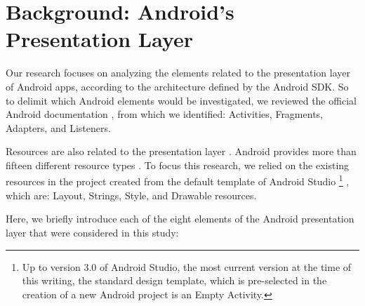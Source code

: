 




\section{Background: Android's Presentation Layer}

Our research focuses on analyzing the elements related to the presentation layer of Android apps, according to the architecture defined by the Android \acs{SDK}. So to delimit which Android elements would be investigated,
we reviewed the official Android documentation \cite{AndroidDeveloperSite2016}, from which we identified: Activities, Fragments, Adapters, and Listeners.

Resources are also related to the presentation layer \cite{AndroidFundamentals}. Android provides more than fifteen different resource types \cite{AndroidResourceType}. To focus this research, we relied on the existing resources in the project created from the default template of Android Studio \cite{FirstApp2017} 
\footnote{Up to version 3.0 of Android Studio, the most current version at the time of this writing, the standard design template, which is pre-selected in the creation of a new Android project is an Empty Activity.}
, which are: Layout, Strings, Style, and Drawable resources.

Here, we briefly introduce each of the eight elements of the Android presentation layer that were considered in this study:

